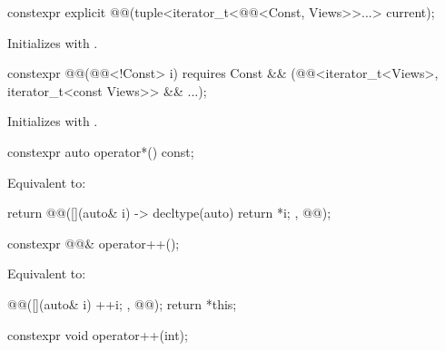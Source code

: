 %
\begin{itemdecl}
constexpr explicit @@(tuple<iterator_t<@@<Const, Views>>...> current);
\end{itemdecl}

\begin{itemdescr}
\pnum
\effects
Initializes  with .
\end{itemdescr}

%
\begin{itemdecl}
constexpr @@(@@<!Const> i)
  requires Const && (@@<iterator_t<Views>, iterator_t<const Views>> && ...);
\end{itemdecl}

\begin{itemdescr}
\pnum
\effects
Initializes  with .
\end{itemdescr}

%
\begin{itemdecl}
constexpr auto operator*() const;
\end{itemdecl}

\begin{itemdescr}
\pnum
\effects
Equivalent to:
\begin{codeblock}
return @@([](auto& i) -> decltype(auto) { return *i; }, @@);
\end{codeblock}
\end{itemdescr}

%
\begin{itemdecl}
constexpr @@& operator++();
\end{itemdecl}

\begin{itemdescr}
\pnum
\effects
Equivalent to:
\begin{codeblock}
@@([](auto& i) { ++i; }, @@);
return *this;
\end{codeblock}
\end{itemdescr}

%
\begin{itemdecl}
constexpr void operator++(int);
\end{itemdecl}

